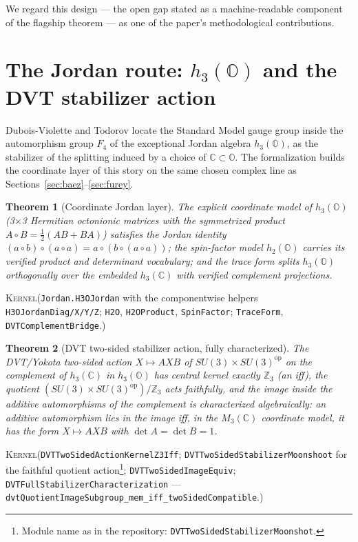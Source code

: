 \documentclass[11pt]{article}
\newcommand{\C}{\mathbb{C}}
\newcommand{\OO}{\mathbb{O}}
\newcommand{\Kernel}{\textcolor{kernelcolor}{\textsc{Kernel}}}
\newcommand{\leanname}[1]{\texttt{#1}}
\newtheorem{theorem}{Theorem}
\begin{document}
We regard this design --- the open gap stated as a machine-readable
component of the flagship theorem --- as one of the paper's
methodological contributions.

\section{The Jordan route: $h_3(\OO)$ and the DVT stabilizer action}
\label{sec:jordan}

Dubois-Violette and Todorov \cite{DVT2018} locate the Standard Model
gauge group inside the automorphism group $F_4$ of the exceptional
Jordan algebra $h_3(\OO)$, as the stabilizer of the splitting induced by
a choice of $\C \subset \OO$.  The formalization builds the coordinate
layer of this story on the same chosen complex line as
Sections~\ref{sec:baez}--\ref{sec:furey}.

\begin{theorem}[Coordinate Jordan layer]
The explicit coordinate model of $h_3(\OO)$ (3$\times$3 Hermitian
octonionic matrices with the symmetrized product
$A \circ B = \tfrac12(AB + BA)$) satisfies the Jordan identity
$(a\circ b)\circ(a\circ a) = a\circ(b\circ(a\circ a))$; the spin-factor
model $h_2(\OO)$ carries its verified product and determinant
vocabulary; and the trace form splits $h_3(\OO)$ orthogonally over the
embedded $h_3(\C)$ with verified complement projections.
\end{theorem}
\noindent\Kernel{}\quad(\leanname{Jordan.H3OJordan} with the
componentwise helpers \leanname{H3OJordanDiag/X/Y/Z};
\leanname{H2O}, \leanname{H2OProduct}, \leanname{SpinFactor};
\leanname{TraceForm}, \leanname{DVTComplementBridge}.)

\begin{theorem}[DVT two-sided stabilizer action, fully characterized]
\label{thm:dvt}
The DVT/Yokota two-sided action $X \mapsto AXB$ of
$SU(3)\times SU(3)^{\mathrm{op}}$ on the complement of $h_3(\C)$ in
$h_3(\OO)$ has central kernel exactly $\mathbb{Z}_3$ (an iff), the
quotient $(SU(3)\times SU(3)^{\mathrm{op}})/\mathbb{Z}_3$ acts
faithfully, and the image inside the additive automorphisms of the
complement is characterized algebraically: an additive automorphism lies
in the image \emph{iff}, in the $M_3(\C)$ coordinate model, it has the
form $X \mapsto AXB$ with $\det A = \det B = 1$.
\end{theorem}
\noindent\Kernel{}\quad(\leanname{DVTTwoSidedActionKernelZ3Iff};
\leanname{DVTTwoSidedStabilizerMoonshoot} for the faithful quotient
action\footnote{Module name as in the repository:
\leanname{DVTTwoSidedStabilizerMoonshot}.};
\leanname{DVTTwoSidedImageEquiv};
\leanname{DVTFullStabilizerCharacterization} ---
\leanname{dvtQuotientImageSubgroup\_mem\_iff\_twoSidedCompatible}.)
\end{document}
